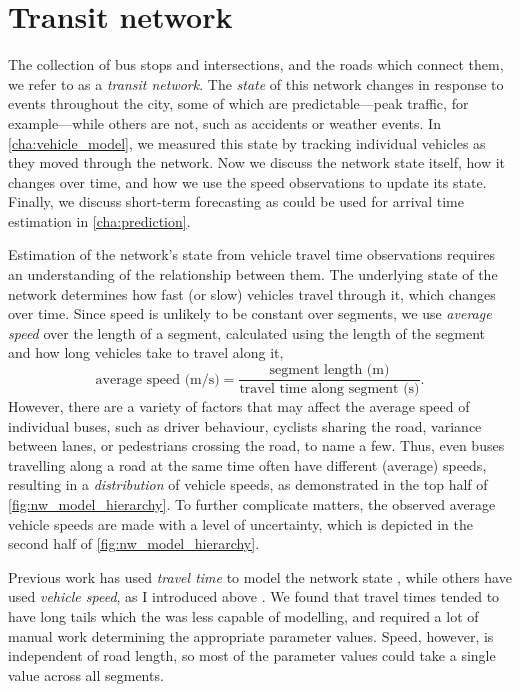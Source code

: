 \chapter{Transit network}
\label{cha:network_model}


The collection of bus stops and intersections, and the roads which connect them, we refer to as a \emph{transit network}. The \emph{state} of this network changes in response to events throughout the city, some of which are predictable---peak traffic, for example---while others are not, such as accidents or weather events. In \cref{cha:vehicle_model}, we measured this state by tracking individual vehicles as they moved through the network. Now we discuss the network state itself, how it changes over time, and how we use the speed observations to update its state. Finally, we discuss short-term forecasting as could be used for arrival time estimation in \cref{cha:prediction}.


Estimation of the network's state from vehicle travel time observations requires an understanding of the relationship between them. The underlying state of the network determines how fast (or slow) vehicles travel through it, which changes over time. Since speed is unlikely to be constant over segments, we use \emph{average speed} over the length of a segment, calculated using the length of the segment and how long vehicles take to travel along it,
\begin{equation}
\label{eq:ch4:average_speed_formula}
\text{average speed (m/s)} = \frac{
\text{segment length (m)}
}{
\text{travel time along segment (s)}
}.
\end{equation}
However, there are a variety of factors that may affect the average speed of individual buses, such as driver behaviour, cyclists sharing the road, variance between lanes, or pedestrians crossing the road, to name a few. Thus, even buses travelling along a road at the same time often have different (average) speeds, resulting in a \emph{distribution} of vehicle speeds, as demonstrated in the top half of \cref{fig:nw_model_hierarchy}. To further complicate matters, the observed average vehicle speeds are made with a level of uncertainty, which is depicted in the second half of \cref{fig:nw_model_hierarchy}.


Previous work has used \emph{travel time} to model the network state \citep{Yu_2011,Cats_2015,Gong_2013,Shalaby_2004,Reinhoudt_1997}, while others have used \emph{vehicle speed}, as I introduced above \citep{Ma_2019,Celan_2017,Celan_2018,Xinghao_2013}. We found that travel times tended to have long tails which the \kf{} was less capable of modelling, and required a lot of manual work determining the appropriate parameter values. Speed, however, is independent of road length, so most of the parameter values could take a single value across all segments.


